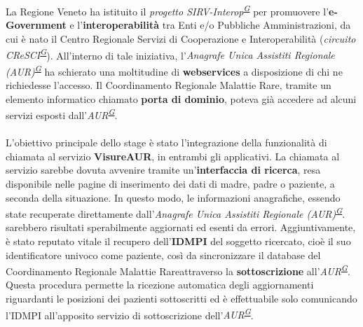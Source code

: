 \documentclass[a4paper]{article}
\newcommand{\crmr}{Coordinamento Regionale Malattie Rare}
\begin{document}
\\ \\
La Regione Veneto ha istituito il \textit{progetto SIRV-Interop\textsuperscript{\hyperref[sec:gl]{G}}} per promuovere l'\textbf{e-Government} e l'\textbf{interoperabilità} tra Enti e/o Pubbliche Amministrazioni, da cui è nato il Centro Regionale Servizi di Cooperazione e Interoperabilità (\textit{circuito CReSCI\textsuperscript{\hyperref[sec:gl]{G}}}). All'interno di tale iniziativa, l'\textit{Anagrafe Unica Assistiti Regionale (AUR)\textsuperscript{\hyperref[sec:gl]{G}}} ha schierato una moltitudine di \textbf{webservices} a disposizione di chi ne richiedesse l'accesso. Il \crmr, tramite un elemento informatico chiamato \textbf{porta di dominio}, poteva già accedere ad alcuni servizi esposti dall'\textit{AUR\textsuperscript{\hyperref[sec:gl]{G}}}.
\\ \\
L'obiettivo principale dello stage è stato l'integrazione della funzionalità di chiamata al servizio \textbf{VisureAUR}, in entrambi gli applicativi. La chiamata al servizio sarebbe dovuta avvenire tramite un'\textbf{interfaccia di ricerca}, resa disponibile nelle pagine di inserimento dei dati di madre, padre o paziente, a seconda della situazione. In questo modo, le informazioni anagrafiche, essendo state recuperate direttamente dall'\textit{Anagrafe Unica Assistiti Regionale (AUR)\textsuperscript{\hyperref[sec:gl]{G}}}. sarebbero risultati sperabilmente aggiornati ed esenti da errori. Aggiuntivamente, è stato reputato vitale  il recupero dell'\textbf{IDMPI} del soggetto ricercato, cioè il suo identificatore univoco come paziente, così da sincronizzare il database del \crmr attraverso la \textbf{sottoscrizione} all'\textit{AUR\textsuperscript{\hyperref[sec:gl]{G}}}. Questa procedura permette la ricezione automatica degli aggiornamenti riguardanti le posizioni dei pazienti sottoscritti ed è effettuabile solo comunicando l'IDMPI all'apposito servizio di sottoscrizione dell'\textit{AUR\textsuperscript{\hyperref[sec:gl]{G}}}.

\newpage
\end{document}
